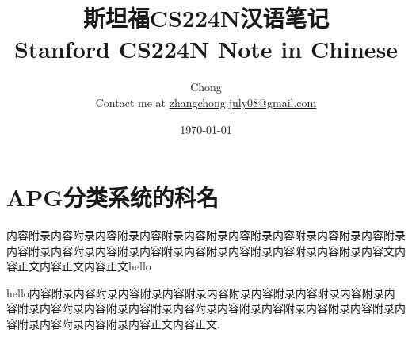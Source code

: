 \documentclass[utf8, hyperref]{book}
\begin{document}
\title{斯坦福CS224N汉语笔记 \\ Stanford CS224N Note in Chinese}
\author{Chong \\ Contact me at \url{zhangchong.july08@gmail.com}}
\date{\today}

\frontmatter

\maketitle
\tableofcontents


\mainmatter







% 

\appendix

\chapter{APG分类系统的科名}


内容附录内容附录内容附录内容附录内容附录内容附录内容附录内容附录内容附录内容附录内容附录内容附录内容附录内容附录内容附录内容附录内容附录内容文内容正文内容正文内容正文hello %


hello内容附录内容附录内容附录内容附录内容附录内容附录内容附录内容附录内容附录内容附录内容附录内容附录内容附录内容附录内容附录内容附录内容附录内容附录内容附录内容附录内容正文内容正文\cite{DK1}.


\renewcommand\indexname{索引}
\printindex
{}


\backmatter


\end{document}
